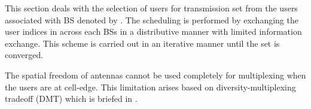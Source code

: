 
This section deals with the selection of users for transmission set  from the users associated with BS  denoted by . The scheduling is performed by exchanging the user indices in  across each BSs in a distributive manner with limited information exchange. This scheme is carried out in an iterative manner until the set  is converged. 

The spatial freedom of  antennas cannot be used completely for multiplexing when the users are at cell-edge. This limitation arises based on diversity-multiplexing tradeoff (DMT) which is briefed in \cite{tse2005fundamentals}.